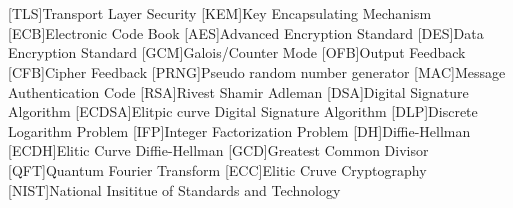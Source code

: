 \cleardoublepage
\chapter*{\listofabbrevname}
{}

\begin{acronym}[mmmmmmm]
	[TLS]{Transport Layer Security}
	[KEM]{Key Encapsulating Mechanism}
	[ECB]{Electronic Code Book}
	[AES]{Advanced Encryption Standard}
	[DES]{Data Encryption Standard}
	[GCM]{Galois/Counter Mode}
	[OFB]{Output Feedback}
	[CFB]{Cipher Feedback}
	[PRNG]{Pseudo random number generator}
	[MAC]{Message Authentication Code}
	[RSA]{Rivest Shamir Adleman}
	[DSA]{Digital Signature Algorithm}
	[ECDSA]{Elitpic curve Digital Signature Algorithm}
	[DLP]{Discrete Logarithm Problem}
	[IFP]{Integer Factorization Problem}
	[DH]{Diffie-Hellman}
	[ECDH]{Elitic Curve Diffie-Hellman}
	[GCD]{Greatest Common Divisor}
	[QFT]{Quantum Fourier Transform}
	[ECC]{Elitic Cruve Cryptography}
	[NIST]{National Insititue of Standards and Technology}
\end{acronym}
